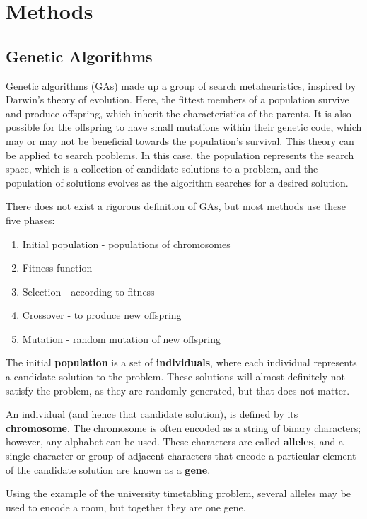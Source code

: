 \documentclass[a4paper, 12pt]{report}
\begin{document}
\section{Methods}
\subsection{Genetic Algorithms}
Genetic algorithms (GAs) made up a group of search metaheuristics, inspired by
Darwin's theory of evolution. Here, the fittest members of a population survive
and produce offspring, which inherit the characteristics of the parents. It is
also possible for the offspring to have small mutations within their genetic
code, which may or may not be beneficial towards the population's survival.
This theory can be applied to search problems. In this case, the population
represents the search space, which is a collection of candidate solutions to a
problem, and the population of solutions evolves as the algorithm searches for
a desired solution.

There does not exist a rigorous definition of GAs, but most methods use these
five phases:
\begin{enumerate}
    \item Initial population - populations of chromosomes
    \item Fitness function
    \item Selection - according to fitness
    \item Crossover - to produce new offspring
    \item Mutation - random mutation of new offspring
\end{enumerate}

The initial \textbf{population} is a set of \textbf{individuals}, where each
individual represents a candidate solution to the problem. These solutions will
almost definitely not satisfy the problem, as they are randomly generated, but
that does not matter.

An individual (and hence that candidate solution), is defined by its
\textbf{chromosome}. The chromosome is often encoded as a string of binary
characters; however, any alphabet can be used. These characters are called
\textbf{alleles}, and a single character or group of adjacent characters that
encode a particular element of the candidate solution are known as a
\textbf{gene}.

Using the example of the university timetabling problem, several alleles may be
used to encode a room, but together they are one gene.
\end{document}

